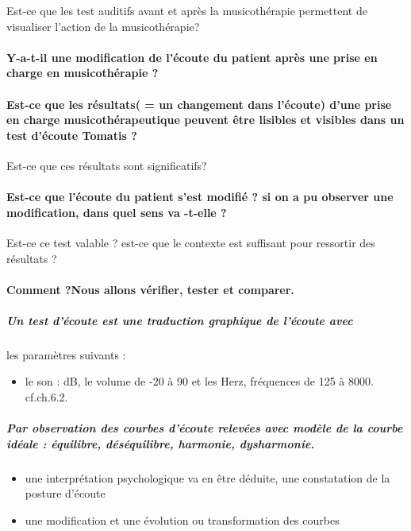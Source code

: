 Est-ce que les test auditifs avant et après la musicothérapie permettent
de visualiser l'action de la musicothérapie?

\paragraph{Y-a-t-il une modification de l'écoute du patient après une prise
en charge en musicothérapie ?}

\paragraph{Est-ce que les résultats( = un changement dans l'écoute) d'une prise
en charge musicothérapeutique peuvent être lisibles et visibles dans
un test d'écoute Tomatis ?}

Est-ce que ces résultats sont significatifs? 

\paragraph{Est-ce que l'écoute du patient s'est modifié ? si on a pu observer
une modification, dans quel sens va -t-elle ?}

Est-ce ce test valable ? est-ce que le contexte est suffisant pour
ressortir des résultats ?

\paragraph{Comment ?Nous allons vérifier, tester et comparer.}

\subparagraph{Un test d'écoute est une traduction graphique de l'écoute avec }

les paramètres suivants : 
\begin{itemize}
\item le son : dB, le volume de -20 à 90 et les Herz, fréquences de 125
à 8000. cf.ch.6.2.
\end{itemize}

\subparagraph{Par observation des courbes d'écoute relevées avec modèle de la courbe
idéale : équilibre, déséquilibre, harmonie, dysharmonie.}
\begin{itemize}
\item une interprétation psychologique va en être déduite, une constatation
de la posture d'écoute
\item une modification et une évolution ou transformation des courbes
\end{itemize}




